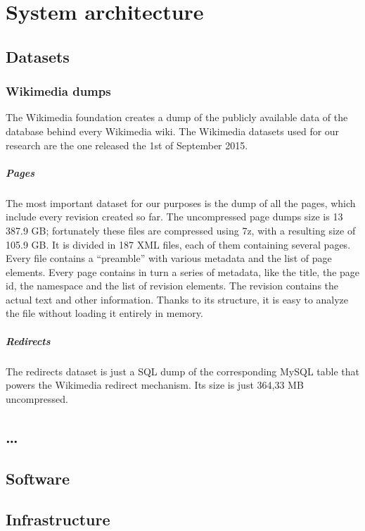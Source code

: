 
\chapter{System architecture}
\label{cha:system_architecture}

\section{Datasets}
\label{sec:datasets}

\subsection{Wikimedia dumps}
The Wikimedia foundation creates a dump of the publicly available data of the database behind every Wikimedia wiki.
The Wikimedia datasets used for our research are the one released the 1st of September 2015.


\paragraph{Pages}
The most important dataset for our purposes is the dump of all the pages, which include every revision created so far.
The uncompressed page dumps size is 13\,387.9 GB\@; fortunately these files are compressed using 7z, with a resulting size of 105.9 GB\@.
It is divided in 187 XML files, each of them containing several pages.
Every file contains a ``preamble'' with various metadata and the list of page elements.
Every page contains in turn a series of metadata, like the title, the page id, the namespace and the list of revision elements.
The revision contains the actual text and other information.
Thanks to its structure, it is easy to analyze the file without loading it entirely in memory.

\paragraph{Redirects}
The redirects dataset is just a SQL dump of the corresponding MySQL table that powers the Wikimedia redirect mechanism.
Its size is just 364,33 MB uncompressed.

\section{\ldots}


\section{Software}
\label{sec:software}


\section{Infrastructure}
\label{sec:infrastructure}
